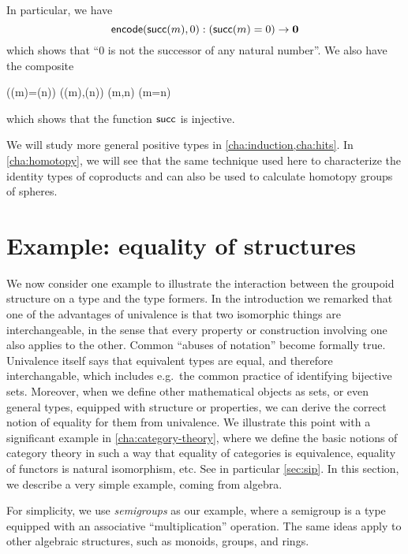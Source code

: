 In particular, we have
\begin{equation}\label{eq:zero-not-succ}
  \encode(\suc(m),0) : (\suc(m)=0) \to \emptyt
\end{equation}
which shows that ``$0$ is not the successor of any natural number''.
We also have the composite
\begin{narrowmultline}\label{eq:suc-injective}
  (\suc(m)=\suc(n))
  \xrightarrow{\encode} \narrowbreak
  \code(\suc(m),\suc(n))
  \jdeq \code(m,n) \xrightarrow{\decode} (m=n)
\end{narrowmultline}
which shows that the function $\mathsf{succ}$ is injective.

We will study more general positive types in \autoref{cha:induction,cha:hits}.
In \autoref{cha:homotopy}, we will see that the same technique used here to characterize the identity types of coproducts and \nat can also be used to calculate homotopy groups of spheres.

%
%

\section{Example: equality of structures}

We now consider one example to illustrate the interaction between the groupoid structure on a type and the type
formers.  In the introduction we remarked that one of the
advantages of univalence is that two isomorphic things are interchangeable,
in the sense that every property or construction involving one also
applies to the other.  Common ``abuses of notation'' become formally
true.  Univalence itself says that equivalent types are equal, and
therefore interchangable, which includes e.g.\  the common practice of identifying bijective sets.  Moreover, when we define other
mathematical objects as sets, or even general types, equipped with structure or properties, we
can derive the correct notion of equality for them from univalence.  We illustrate this
point with a significant example in \cref{cha:category-theory}, where we
define the basic notions of category theory in such a way that equality
of categories is equivalence, equality of functors is natural
isomorphism, etc. See in particular \autoref{sec:sip}.
 In this section, we describe a very simple example, coming from algebra.

For simplicity, we use \emph{semigroups} as our example, where a
semigroup is a type equipped with an associative ``multiplication''
operation.  The same ideas apply to other algebraic structures, such as
monoids, groups, and rings.

